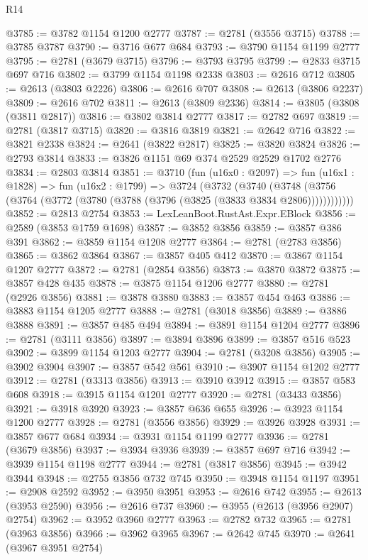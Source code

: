 \begin{lexlean}{R14}
\begin{coremodule}
@3785 := @3782 @1154 @1200 @2777
@3787 := @2781 (@3556 @3715)
@3788 := @3785 @3787
@3790 := @3716 @677 @684
@3793 := @3790 @1154 @1199 @2777
@3795 := @2781 (@3679 @3715)
@3796 := @3793 @3795
@3799 := @2833 @3715 @697 @716
@3802 := @3799 @1154 @1198 @2338
@3803 := @2616 @712
@3805 := @2613 (@3803 @2226)
@3806 := @2616 @707
@3808 := @2613 (@3806 @2237)
@3809 := @2616 @702
@3811 := @2613 (@3809 @2336)
@3814 := @3805 (@3808 (@3811 @2817))
@3816 := @3802 @3814 @2777
@3817 := @2782 @697
@3819 := @2781 (@3817 @3715)
@3820 := @3816 @3819
@3821 := @2642 @716
@3822 := @3821 @2338
@3824 := @2641 (@3822 @2817)
@3825 := @3820 @3824
@3826 := @2793 @3814
@3833 := @3826 @1151 @69 @374 @2529 @2529 @1702 @2776
@3834 := @2803 @3814
@3851 := @3710
    (fun (u16x0 : @2097) =>
    fun (u16x1 : @1828) =>
    fun (u16x2 : @1799) =>
    @3724
      (@3732
        (@3740
          (@3748 (@3756 (@3764 (@3772 (@3780 (@3788 (@3796 (@3825 (@3833 @3834 @2806))))))))))))
@3852 := @2813 @2754
@3853 := LexLeanBoot.RustAst.Expr.EBlock
@3856 := @2589 (@3853 @1759 @1698)
@3857 := @3852 @3856
@3859 := @3857 @386 @391
@3862 := @3859 @1154 @1208 @2777
@3864 := @2781 (@2783 @3856)
@3865 := @3862 @3864
@3867 := @3857 @405 @412
@3870 := @3867 @1154 @1207 @2777
@3872 := @2781 (@2854 @3856)
@3873 := @3870 @3872
@3875 := @3857 @428 @435
@3878 := @3875 @1154 @1206 @2777
@3880 := @2781 (@2926 @3856)
@3881 := @3878 @3880
@3883 := @3857 @454 @463
@3886 := @3883 @1154 @1205 @2777
@3888 := @2781 (@3018 @3856)
@3889 := @3886 @3888
@3891 := @3857 @485 @494
@3894 := @3891 @1154 @1204 @2777
@3896 := @2781 (@3111 @3856)
@3897 := @3894 @3896
@3899 := @3857 @516 @523
@3902 := @3899 @1154 @1203 @2777
@3904 := @2781 (@3208 @3856)
@3905 := @3902 @3904
@3907 := @3857 @542 @561
@3910 := @3907 @1154 @1202 @2777
@3912 := @2781 (@3313 @3856)
@3913 := @3910 @3912
@3915 := @3857 @583 @608
@3918 := @3915 @1154 @1201 @2777
@3920 := @2781 (@3433 @3856)
@3921 := @3918 @3920
@3923 := @3857 @636 @655
@3926 := @3923 @1154 @1200 @2777
@3928 := @2781 (@3556 @3856)
@3929 := @3926 @3928
@3931 := @3857 @677 @684
@3934 := @3931 @1154 @1199 @2777
@3936 := @2781 (@3679 @3856)
@3937 := @3934 @3936
@3939 := @3857 @697 @716
@3942 := @3939 @1154 @1198 @2777
@3944 := @2781 (@3817 @3856)
@3945 := @3942 @3944
@3948 := @2755 @3856 @732 @745
@3950 := @3948 @1154 @1197
@3951 := @2908 @2592
@3952 := @3950 @3951
@3953 := @2616 @742
@3955 := @2613 (@3953 @2590)
@3956 := @2616 @737
@3960 := @3955 (@2613 (@3956 @2907) @2754)
@3962 := @3952 @3960 @2777
@3963 := @2782 @732
@3965 := @2781 (@3963 @3856)
@3966 := @3962 @3965
@3967 := @2642 @745
@3970 := @2641 (@3967 @3951 @2754)

\end{coremodule}
\end{lexlean}
